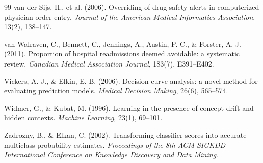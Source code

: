 \documentclass[11pt,a4paper]{article}
\begin{document}
\begin{thebibliography}{99}
 van der Sijs, H., et al. (2006). Overriding of drug safety alerts in computerized physician order entry. \emph{Journal of the American Medical Informatics Association}, 13(2), 138--147.

 van Walraven, C., Bennett, C., Jennings, A., Austin, P. C., \& Forster, A. J. (2011). Proportion of hospital readmissions deemed avoidable: a systematic review. \emph{Canadian Medical Association Journal}, 183(7), E391--E402.

 Vickers, A. J., \& Elkin, E. B. (2006). Decision curve analysis: a novel method for evaluating prediction models. \emph{Medical Decision Making}, 26(6), 565--574.

 Widmer, G., \& Kubat, M. (1996). Learning in the presence of concept drift and hidden contexts. \emph{Machine Learning}, 23(1), 69--101.

 Zadrozny, B., \& Elkan, C. (2002). Transforming classifier scores into accurate multiclass probability estimates. \emph{Proceedings of the 8th ACM SIGKDD International Conference on Knowledge Discovery and Data Mining}.

\end{thebibliography}
\end{document}
